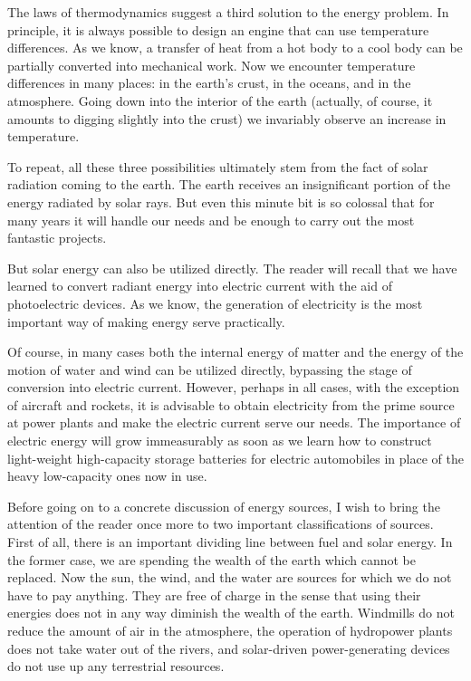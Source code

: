 The laws of thermodynamics suggest a third solution to the energy problem. In principle, it is always possible to design an engine that can use temperature differences. As we know, a transfer of heat from a hot body to a cool body can be partially converted into mechanical work. Now we encounter temperature differences in many places: in the earth's crust, in the oceans, and in the atmosphere. Going down into the interior of the earth (actually, of course, it amounts to digging slightly into the crust) we invariably observe an increase in temperature.

To repeat, all these three possibilities ultimately stem from the fact of solar radiation coming to the earth. The earth receives an insignificant portion of the energy radiated by solar rays. But even this minute bit is so colossal that for many years it will handle our needs and be enough to carry out the most fantastic projects.

But solar energy can also be utilized directly. The reader will recall that we have learned to convert radiant energy into electric current with the aid of photoelectric devices. As we know, the generation of electricity is the most important way of making energy serve practically.

Of course, in many cases both the internal energy of matter and the energy of the motion of water and wind can be utilized directly, bypassing the stage of conversion into electric current. However, perhaps in all cases, with the exception of aircraft and rockets, it is advisable to obtain electricity from the prime source at power plants and make the electric current serve our needs. The importance of electric energy will grow immeasurably as soon as we learn how to construct light-weight high-capacity storage batteries for electric automobiles in place of the heavy low-capacity ones now in use.

Before going on to a concrete discussion of energy sources, I wish to bring the attention of the reader once more to two important classifications of sources. First of all, there is an important dividing line between fuel and solar energy. In the former case, we are spending the wealth of the earth which cannot be replaced. Now the sun, the wind, and the water are sources for which we do not have to pay anything. They are free of charge in the sense that using their energies does not in any way diminish the wealth of the earth. Windmills do not reduce the amount of air in the atmosphere, the operation of hydropower plants does not take water out of the rivers, and solar-driven power-generating devices do not use up any terrestrial resources.

